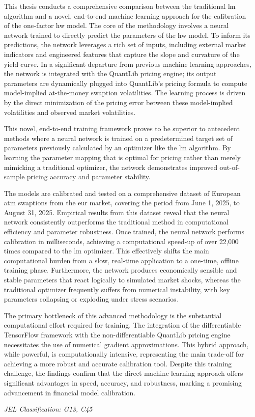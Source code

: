 This thesis conducts a comprehensive comparison between the traditional \ac{lm} algorithm and a novel, end-to-end machine learning approach for the calibration of the one-factor \ac{hw} model. The core of the methodology involves a neural network trained to directly predict the parameters of the \ac{hw} model. To inform its predictions, the network leverages a rich set of inputs, including external market indicators and engineered features that capture the slope and curvature of the yield curve. In a significant departure from previous machine learning approaches, the network is integrated with the QuantLib pricing engine; its output parameters are dynamically plugged into QuantLib's pricing formula to compute model-implied at-the-money swaption volatilities. The learning process is driven by the direct minimization of the pricing error between these model-implied volatilities and observed market volatilities.

This novel, end-to-end training framework proves to be superior to antecedent methods where a neural network is trained on a predetermined target set of parameters previously calculated by an optimizer like the \ac{lm} algorithm. By learning the parameter mapping that is optimal for pricing rather than merely mimicking a traditional optimizer, the network demonstrates improved out-of-sample pricing accuracy and parameter stability.

The models are calibrated and tested on a comprehensive dataset of European \ac{atm} swaptions from the \ac{eur} market, covering the period from June 1, 2025, to August 31, 2025. Empirical results from this dataset reveal that the neural network consistently outperforms the traditional method in computational efficiency and parameter robustness. Once trained, the neural network performs calibration in milliseconds, achieving a computational speed-up of over 22,000 times compared to the \ac{lm} optimizer. This effectively shifts the main computational burden from a slow, real-time application to a one-time, offline training phase. Furthermore, the network produces economically sensible and stable parameters that react logically to simulated market shocks, whereas the traditional optimizer frequently suffers from numerical instability, with key parameters collapsing or exploding under stress scenarios.

The primary bottleneck of this advanced methodology is the substantial computational effort required for training. The integration of the differentiable TensorFlow framework with the non-differentiable QuantLib pricing engine necessitates the use of numerical gradient approximations. This hybrid approach, while powerful, is computationally intensive, representing the main trade-off for achieving a more robust and accurate calibration tool. Despite this training challenge, the findings confirm that the direct machine learning approach offers significant advantages in speed, accuracy, and robustness, marking a promising advancement in financial model calibration.

\textit{JEL Classification: G13, C45}